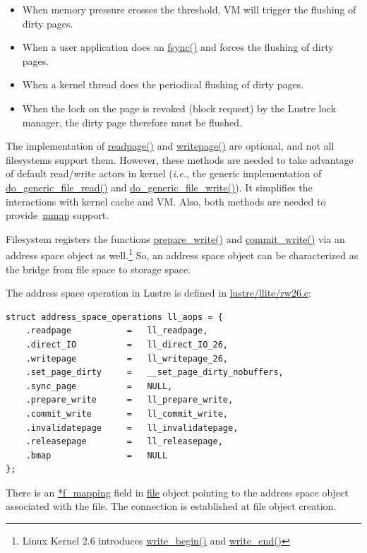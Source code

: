 \begin{itemize}

  \item When memory pressure crosses the threshold, VM will trigger 
  the flushing of dirty pages.
  
  \item When a user application does an \url{fsync()} and forces the flushing of
  dirty pages.

  \item When a kernel thread does the periodical flushing of dirty pages. 

  \item When the lock on the page is revoked (block request) by the Lustre
  lock manager, the dirty page therefore must be flushed.

\end{itemize}

The implementation of \url{readpage()} and \url{writepage()} are optional, and
not all filesystems support them. However, these methods are needed to take
advantage of default read/write actors in kernel (\textit{i.e.}, the generic
implementation of \url{do_generic_file_read()} and
\url{do_generic_file_write()}). It simplifies the interactions with kernel
cache and VM. Also, both methods are needed to provide~\url{mmap} support.  

Filesystem registers the functions \url{prepare_write()} and \url{commit_write()}
via an address space object as well.\footnote{Linux Kernel 2.6 introduces
\url{write_begin()} and \url{write_end()}} So, an address space object can be
characterized as the bridge from file space to storage space.

The address space operation in Lustre is defined in \url{lustre/llite/rw26.c}:

\begin{Verbatim}
struct address_space_operations ll_aops = {
    .readpage           =   ll_readpage,
    .direct_IO          =   ll_direct_IO_26,
    .writepage          =   ll_writepage_26,
    .set_page_dirty     =   __set_page_dirty_nobuffers,
    .sync_page          =   NULL,
    .prepare_write      =   ll_prepare_write,
    .commit_write       =   ll_commit_write,
    .invalidatepage     =   ll_invalidatepage,
    .releasepage        =   ll_releasepage,
    .bmap               =   NULL
};
\end{Verbatim}

There is an \url{*f_mapping} field in \url{file} object pointing to the address
space object associated with the file. The connection is established at file
object creation. 

